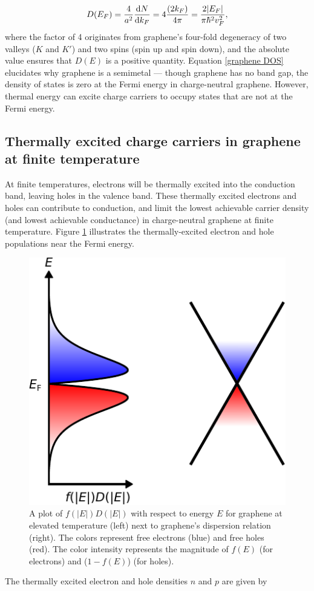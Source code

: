\documentclass[double,12pt,1in,seploa]{beavtex}
\let\Oldsubsection\subsection
\renewcommand{\subsection}{\FloatBarrier\Oldsubsection}
\begin{document}
\begin{equation}
    D(E_F) = \frac{4}{a^2} \derivative{N}{k_F} = 4\frac{(2k_F)}{4 \pi} = \frac{2\abs{E_F}}{\pi \hbar^2 v_F^2}, \label{graphene DOS}
\end{equation}
where the factor of 4 originates from graphene's four-fold degeneracy of two valleys ($K$ and $K'$) and two spins (spin up and spin down), and the absolute value ensures that $D(E)$ is a positive quantity. Equation \ref{graphene DOS} elucidates why graphene is a semimetal — though graphene has no band gap, the density of states is zero at the Fermi energy in charge-neutral graphene. However, thermal energy can excite charge carriers to occupy states that are not at the Fermi energy.

\subsection{Thermally excited charge carriers in graphene at finite temperature}
At finite temperatures, electrons will be thermally excited into the conduction band, leaving holes in the valence band. These thermally excited electrons and holes can contribute to conduction, and limit the lowest achievable carrier density (and lowest achievable conductance) in charge-neutral graphene at finite temperature. Figure \ref{graphene at elevated T plot} illustrates the thermally-excited electron and hole populations near the Fermi energy. 
\begin{figure}
    \includegraphics{graphene theory 3.pdf}
    \caption{A plot of $f(|E|)D(|E|)$ with respect to energy $E$ for graphene at elevated temperature (left) next to graphene's dispersion relation (right). The colors represent free electrons (blue) and free holes (red). The color intensity represents the magnitude of $f(E)$ (for electrons) and ($1-f(E)$) (for holes).}
    \label{graphene at elevated T plot}
\end{figure}
The thermally excited electron and hole densities $n$ and $p$ are given by
\end{document}
